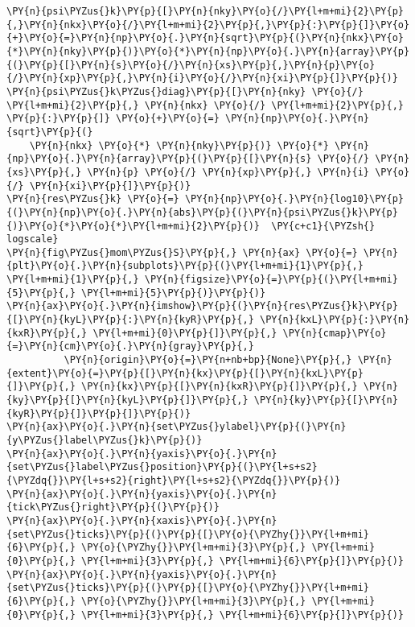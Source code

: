 \begin{Verbatim}[commandchars=\\\{\}]
\PY{n}{psi\PYZus{}k}\PY{p}{[}\PY{n}{nky}\PY{o}{/}\PY{l+m+mi}{2}\PY{p}{,}\PY{n}{nkx}\PY{o}{/}\PY{l+m+mi}{2}\PY{p}{,}\PY{p}{:}\PY{p}{]}\PY{o}{+}\PY{o}{=}\PY{n}{np}\PY{o}{.}\PY{n}{sqrt}\PY{p}{(}\PY{n}{nkx}\PY{o}{*}\PY{n}{nky}\PY{p}{)}\PY{o}{*}\PY{n}{np}\PY{o}{.}\PY{n}{array}\PY{p}{(}\PY{p}{[}\PY{n}{s}\PY{o}{/}\PY{n}{xs}\PY{p}{,}\PY{n}{p}\PY{o}{/}\PY{n}{xp}\PY{p}{,}\PY{n}{i}\PY{o}{/}\PY{n}{xi}\PY{p}{]}\PY{p}{)}
\PY{n}{psi\PYZus{}k\PYZus{}diag}\PY{p}{[}\PY{n}{nky} \PY{o}{/} \PY{l+m+mi}{2}\PY{p}{,} \PY{n}{nkx} \PY{o}{/} \PY{l+m+mi}{2}\PY{p}{,} \PY{p}{:}\PY{p}{]} \PY{o}{+}\PY{o}{=} \PY{n}{np}\PY{o}{.}\PY{n}{sqrt}\PY{p}{(}
    \PY{n}{nkx} \PY{o}{*} \PY{n}{nky}\PY{p}{)} \PY{o}{*} \PY{n}{np}\PY{o}{.}\PY{n}{array}\PY{p}{(}\PY{p}{[}\PY{n}{s} \PY{o}{/} \PY{n}{xs}\PY{p}{,} \PY{n}{p} \PY{o}{/} \PY{n}{xp}\PY{p}{,} \PY{n}{i} \PY{o}{/} \PY{n}{xi}\PY{p}{]}\PY{p}{)}
\PY{n}{res\PYZus{}k} \PY{o}{=} \PY{n}{np}\PY{o}{.}\PY{n}{log10}\PY{p}{(}\PY{n}{np}\PY{o}{.}\PY{n}{abs}\PY{p}{(}\PY{n}{psi\PYZus{}k}\PY{p}{)}\PY{o}{*}\PY{o}{*}\PY{l+m+mi}{2}\PY{p}{)}  \PY{c+c1}{\PYZsh{} logscale}
\PY{n}{fig\PYZus{}mom\PYZus{}S}\PY{p}{,} \PY{n}{ax} \PY{o}{=} \PY{n}{plt}\PY{o}{.}\PY{n}{subplots}\PY{p}{(}\PY{l+m+mi}{1}\PY{p}{,} \PY{l+m+mi}{1}\PY{p}{,} \PY{n}{figsize}\PY{o}{=}\PY{p}{(}\PY{l+m+mi}{5}\PY{p}{,} \PY{l+m+mi}{5}\PY{p}{)}\PY{p}{)}
\PY{n}{ax}\PY{o}{.}\PY{n}{imshow}\PY{p}{(}\PY{n}{res\PYZus{}k}\PY{p}{[}\PY{n}{kyL}\PY{p}{:}\PY{n}{kyR}\PY{p}{,} \PY{n}{kxL}\PY{p}{:}\PY{n}{kxR}\PY{p}{,} \PY{l+m+mi}{0}\PY{p}{]}\PY{p}{,} \PY{n}{cmap}\PY{o}{=}\PY{n}{cm}\PY{o}{.}\PY{n}{gray}\PY{p}{,}
          \PY{n}{origin}\PY{o}{=}\PY{n+nb+bp}{None}\PY{p}{,} \PY{n}{extent}\PY{o}{=}\PY{p}{[}\PY{n}{kx}\PY{p}{[}\PY{n}{kxL}\PY{p}{]}\PY{p}{,} \PY{n}{kx}\PY{p}{[}\PY{n}{kxR}\PY{p}{]}\PY{p}{,} \PY{n}{ky}\PY{p}{[}\PY{n}{kyL}\PY{p}{]}\PY{p}{,} \PY{n}{ky}\PY{p}{[}\PY{n}{kyR}\PY{p}{]}\PY{p}{]}\PY{p}{)}
\PY{n}{ax}\PY{o}{.}\PY{n}{set\PYZus{}ylabel}\PY{p}{(}\PY{n}{y\PYZus{}label\PYZus{}k}\PY{p}{)}
\PY{n}{ax}\PY{o}{.}\PY{n}{yaxis}\PY{o}{.}\PY{n}{set\PYZus{}label\PYZus{}position}\PY{p}{(}\PY{l+s+s2}{\PYZdq{}}\PY{l+s+s2}{right}\PY{l+s+s2}{\PYZdq{}}\PY{p}{)}
\PY{n}{ax}\PY{o}{.}\PY{n}{yaxis}\PY{o}{.}\PY{n}{tick\PYZus{}right}\PY{p}{(}\PY{p}{)}
\PY{n}{ax}\PY{o}{.}\PY{n}{xaxis}\PY{o}{.}\PY{n}{set\PYZus{}ticks}\PY{p}{(}\PY{p}{[}\PY{o}{\PYZhy{}}\PY{l+m+mi}{6}\PY{p}{,} \PY{o}{\PYZhy{}}\PY{l+m+mi}{3}\PY{p}{,} \PY{l+m+mi}{0}\PY{p}{,} \PY{l+m+mi}{3}\PY{p}{,} \PY{l+m+mi}{6}\PY{p}{]}\PY{p}{)}
\PY{n}{ax}\PY{o}{.}\PY{n}{yaxis}\PY{o}{.}\PY{n}{set\PYZus{}ticks}\PY{p}{(}\PY{p}{[}\PY{o}{\PYZhy{}}\PY{l+m+mi}{6}\PY{p}{,} \PY{o}{\PYZhy{}}\PY{l+m+mi}{3}\PY{p}{,} \PY{l+m+mi}{0}\PY{p}{,} \PY{l+m+mi}{3}\PY{p}{,} \PY{l+m+mi}{6}\PY{p}{]}\PY{p}{)}

\end{Verbatim}
